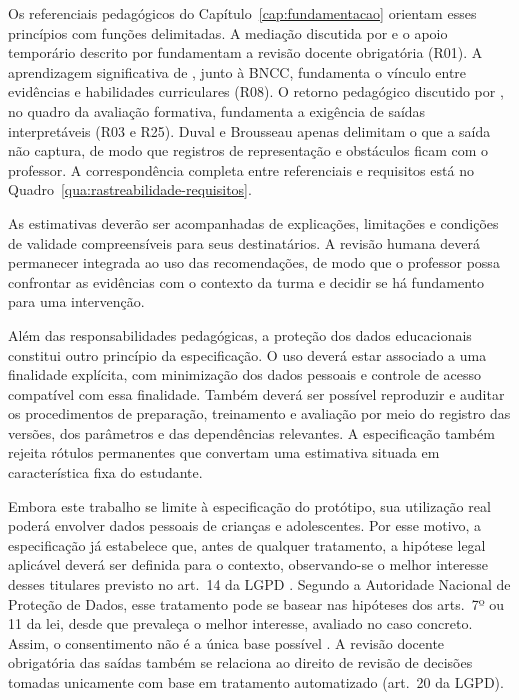 Os referenciais pedagógicos do Capítulo~\ref{cap:fundamentacao} orientam esses princípios com funções delimitadas. A mediação discutida por  e o apoio temporário descrito por  fundamentam a revisão docente obrigatória (R01). A aprendizagem significativa de , junto à BNCC, fundamenta o vínculo entre evidências e habilidades curriculares (R08). O retorno pedagógico discutido por , no quadro da avaliação formativa, fundamenta a exigência de saídas interpretáveis (R03 e R25). Duval e Brousseau apenas delimitam o que a saída não captura, de modo que registros de representação e obstáculos ficam com o professor. A correspondência completa entre referenciais e requisitos está no Quadro~\ref{qua:rastreabilidade-requisitos}.

As estimativas deverão ser acompanhadas de explicações, limitações e condições de validade compreensíveis para seus destinatários. A revisão humana deverá permanecer integrada ao uso das recomendações, de modo que o professor possa confrontar as evidências com o contexto da turma e decidir se há fundamento para uma intervenção.

Além das responsabilidades pedagógicas, a proteção dos dados educacionais constitui outro princípio da especificação. O uso deverá estar associado a uma finalidade explícita, com minimização dos dados pessoais e controle de acesso compatível com essa finalidade. Também deverá ser possível reproduzir e auditar os procedimentos de preparação, treinamento e avaliação por meio do registro das versões, dos parâmetros e das dependências relevantes. A especificação também rejeita rótulos permanentes que convertam uma estimativa situada em característica fixa do estudante.

Embora este trabalho se limite à especificação do protótipo, sua utilização real poderá envolver dados pessoais de crianças e adolescentes. Por esse motivo, a especificação já estabelece que, antes de qualquer tratamento, a hipótese legal aplicável deverá ser definida para o contexto, observando-se o melhor interesse desses titulares previsto no art.~14 da LGPD \cite{LGPD2018}. Segundo a Autoridade Nacional de Proteção de Dados, esse tratamento pode se basear nas hipóteses dos arts.~7º ou 11 da lei, desde que prevaleça o melhor interesse, avaliado no caso concreto. Assim, o consentimento não é a única base possível \cite{ANPDEnunciado12023}. A revisão docente obrigatória das saídas também se relaciona ao direito de revisão de decisões tomadas unicamente com base em tratamento automatizado (art.~20 da LGPD).

